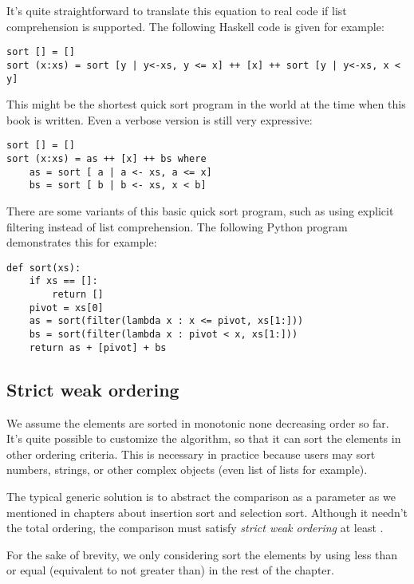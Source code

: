 \documentclass[UTF8]{article}
\begin{document}
It's quite straightforward to translate this equation to real code if list comprehension is supported.
The following Haskell code is given for example:

\lstset{language=Haskell}
\begin{lstlisting}
sort [] = []
sort (x:xs) = sort [y | y<-xs, y <= x] ++ [x] ++ sort [y | y<-xs, x < y]
\end{lstlisting}

This might be the shortest quick sort program in the world at the time when this book is written. Even
a verbose version is still very expressive:

\lstset{language=Haskell}
\begin{lstlisting}
sort [] = []
sort (x:xs) = as ++ [x] ++ bs where
    as = sort [ a | a <- xs, a <= x]
    bs = sort [ b | b <- xs, x < b]
\end{lstlisting}

There are some variants of this basic quick sort program, such as using explicit filtering instead of
list comprehension. The following Python program demonstrates this for example:

\lstset{language=Python}
\begin{lstlisting}
def sort(xs):
    if xs == []:
        return []
    pivot = xs[0]
    as = sort(filter(lambda x : x <= pivot, xs[1:]))
    bs = sort(filter(lambda x : pivot < x, xs[1:]))
    return as + [pivot] + bs
\end{lstlisting}

\subsection{Strict weak ordering}
We assume the elements are sorted in monotonic none decreasing order so far. It's quite possible to customize
the algorithm, so that it can sort the elements in other ordering criteria. This is necessary in practice because
users may sort numbers, strings, or other complex objects (even list of lists for example).

The typical generic solution is to abstract the comparison as a parameter as we mentioned in chapters about
insertion sort and selection sort. Although it needn't the total ordering, the comparison must satisfy
{\em strict weak ordering} at least \cite{wiki-total-order} \cite{wiki-sweak-order}.

For the sake of brevity, we only considering sort the elements by using less than or equal
(equivalent to not greater than) in the rest of the chapter.
\end{document}
